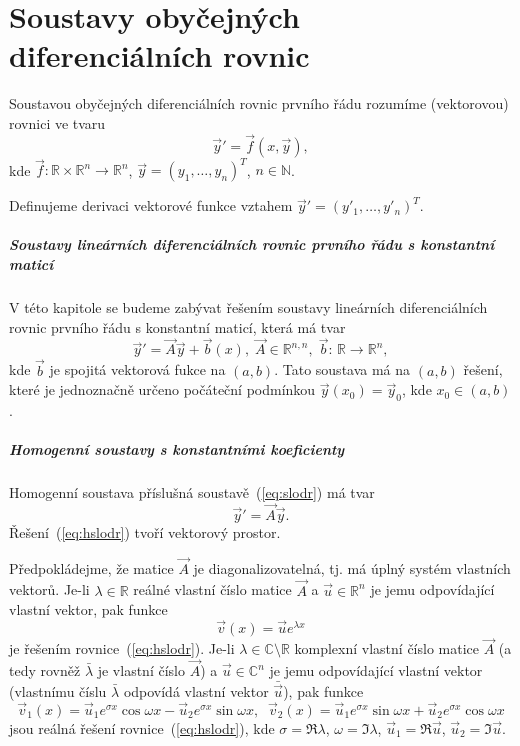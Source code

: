 \chapter{Soustavy obyčejných diferenciálních rovnic}

Soustavou obyčejných diferenciálních rovnic prvního řádu rozumíme (vektorovou) rovnici ve tvaru
\[
   \vec{y}' = \vec{f}(x,\vec{y}),
\]
kde $\vec{f}:\mathbb{R}\times\mathbb{R}^n\rightarrow\mathbb{R}^n$, $\vec{y}=(y_1,\ldots,y_n)^T$, $n\in\mathbb{N}$.

Definujeme derivaci vektorové funkce vztahem $\vec{y}'=(y'_1,\ldots,y'_n)^T$.

\paragraph{Soustavy lineárních diferenciálních rovnic prvního řádu s konstantní maticí}
V této kapitole se budeme zabývat řešením soustavy lineárních diferenciálních rovnic prvního řádu
s konstantní maticí, která má tvar
\begin{equation}\label{eq:slodr}
   \vec{y}' = \vec{A}\vec{y} + \vec{b}(x), \; \vec{A}\in\mathbb{R}^{n,n}, \; \vec{b}:\,\mathbb{R}\rightarrow\mathbb{R}^n,
\end{equation}
kde $\vec{b}$ je spojitá vektorová fukce na $(a,b)$.
Tato soustava má na $(a,b)$ řešení,
které je jednoznačně určeno počáteční podmínkou $\vec{y}(x_0)=\vec{y}_0$, kde $x_0\in(a,b)$.

\paragraph{Homogenní soustavy s konstantními koeficienty}
Homogenní soustava příslušná soustavě~(\ref{eq:slodr}) má tvar
\begin{equation}\label{eq:hslodr}
   \vec{y}'=\vec{A}\vec{y}.
\end{equation}
Řešení~(\ref{eq:hslodr}) tvoří vektorový prostor.

Předpokládejme, že matice $\vec{A}$ je diagonalizovatelná, tj. má úplný systém vlastních vektorů.
Je-li $\lambda\in\mathbb{R}$ reálné vlastní číslo matice $\vec{A}$ a $\vec{u}\in\mathbb{R}^n$ 
je jemu odpovídající vlastní vektor, pak funkce
\[
   \vec{v}(x) = \vec{u}e^{\lambda x}
\]
je řešením rovnice~(\ref{eq:hslodr}).
Je-li $\lambda\in\mathbb{C}\setminus\mathbb{R}$ komplexní vlastní číslo matice $\vec{A}$
(a tedy rovněž $\bar{\lambda}$ je vlastní číslo $\vec{A}$)
a $\vec{u}\in\mathbb{C}^n$ je jemu odpovídající vlastní vektor (vlastnímu číslu $\bar{\lambda}$ odpovídá
vlastní vektor $\bar{\vec{u}}$), pak funkce
\[
   \vec{v}_1(x) = \vec{u}_1 e^{\sigma x}\cos\omega x - \vec{u}_2 e^{\sigma x}\sin\omega x,\;\;
   \vec{v}_2(x) = \vec{u}_1 e^{\sigma x}\sin\omega x + \vec{u}_2 e^{\sigma x}\cos\omega x
\]
jsou reálná řešení rovnice~(\ref{eq:hslodr}),
kde $\sigma=\Re\lambda$, $\omega=\Im\lambda$, $\vec{u}_1 = \Re\vec{u}$, $\vec{u}_2=\Im\vec{u}$.

